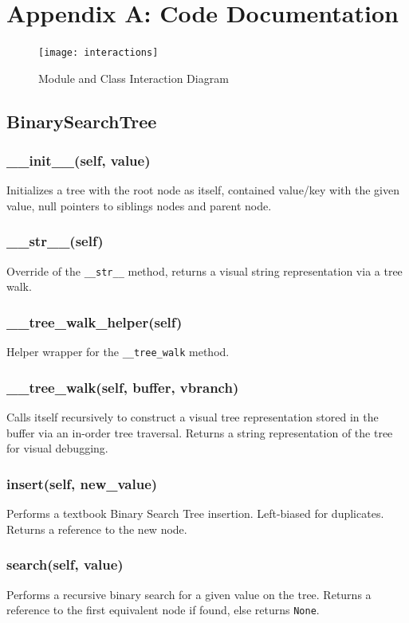 \documentclass[fleqn,10pt]{SelfArx} %
\begin{document}
\clearpage

\section{Appendix A: Code Documentation}

\begin{figure}[ht]
	\texttt{[image: interactions]}
	\caption{Module and Class Interaction Diagram}
	\label{fig:interactions}
\end{figure}

\subsection*{BinarySearchTree}
\subsubsection*{\_\_init\_\_(self, value)}
Initializes a tree with the root node as itself, contained value/key with the given value, null pointers to siblings nodes and parent node. 
\subsubsection*{\_\_str\_\_(self)}
Override of the \texttt{\_\_str\_\_} method, returns a visual string representation via a tree walk.
\subsubsection*{\_\_tree\_walk\_helper(self)}
Helper wrapper for the \texttt{\_\_tree\_walk} method.
\subsubsection*{\_\_tree\_walk(self, buffer, vbranch)}
Calls itself recursively to construct a visual tree representation stored in the buffer via an in-order tree traversal. Returns a string representation of the tree for visual debugging.
\subsubsection*{insert(self, new\_value)}
Performs a textbook Binary Search Tree insertion. Left-biased for duplicates. Returns a reference to the new node.
\subsubsection*{search(self, value)}
Performs a recursive binary search for a given value on the tree. Returns a reference to the first equivalent node if found, else returns \texttt{None}.
\end{document}
